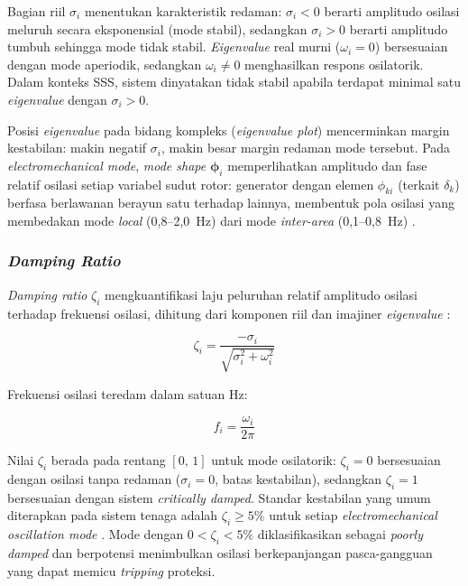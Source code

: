 Bagian riil $\sigma_i$ menentukan karakteristik redaman: $\sigma_i < 0$ berarti
amplitudo osilasi meluruh secara eksponensial (mode stabil), sedangkan $\sigma_i > 0$
berarti amplitudo tumbuh sehingga mode tidak stabil. \textit{Eigenvalue} real murni
($\omega_i = 0$) bersesuaian dengan mode aperiodik, sedangkan $\omega_i \neq 0$
menghasilkan respons osilatorik. Dalam konteks SSS, sistem dinyatakan tidak stabil
apabila terdapat minimal satu \textit{eigenvalue} dengan $\sigma_i > 0$.

Posisi \textit{eigenvalue} pada bidang kompleks (\textit{eigenvalue plot}) mencerminkan
margin kestabilan: makin negatif $\sigma_i$, makin besar margin redaman mode tersebut.
Pada \textit{electromechanical mode}, \textit{mode shape} $\boldsymbol{\phi}_i$
memperlihatkan amplitudo dan fase relatif osilasi setiap variabel sudut rotor:
generator dengan elemen $\phi_{ki}$ (terkait $\delta_k$) berfasa berlawanan berayun
satu terhadap lainnya, membentuk pola osilasi yang membedakan mode \textit{local}
(0{,}8--2{,}0~Hz) dari mode \textit{inter-area} (0{,}1--0{,}8~Hz) \cite{kundur1994power}.

\subsubsection{\textit{Damping Ratio}}

\textit{Damping ratio} $\zeta_i$ mengkuantifikasi laju peluruhan relatif amplitudo
osilasi terhadap frekuensi osilasi, dihitung dari komponen riil dan imajiner
\textit{eigenvalue} \cite{kundur1994power}:

\begin{equation}
  \zeta_i = \frac{-\sigma_i}{\sqrt{\sigma_i^2 + \omega_i^2}}
  \label{eq:damping-ratio}
\end{equation}

Frekuensi osilasi teredam dalam satuan Hz:

\begin{equation}
  f_i = \frac{\omega_i}{2\pi}
  \label{eq:freq-osc}
\end{equation}

Nilai $\zeta_i$ berada pada rentang $[0,\,1]$ untuk mode osilatorik: $\zeta_i = 0$
bersesuaian dengan osilasi tanpa redaman ($\sigma_i = 0$, batas kestabilan),
sedangkan $\zeta_i = 1$ bersesuaian dengan sistem \textit{critically damped}. Standar
kestabilan yang umum diterapkan pada sistem tenaga adalah $\zeta_i \geq 5\%$ untuk
setiap \textit{electromechanical oscillation mode} \cite{kundur1994power}. Mode dengan
$0 < \zeta_i < 5\%$ diklasifikasikan sebagai \textit{poorly damped} dan berpotensi
menimbulkan osilasi berkepanjangan pasca-gangguan yang dapat memicu
\textit{tripping} proteksi.

